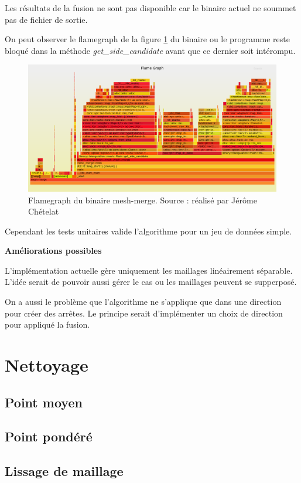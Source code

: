 Les résultats de la fusion ne sont pas disponible car le binaire actuel ne
soummet pas de fichier de sortie.

On peut observer le flamegraph de la figure \ref{fig:flamegraph_mesh_merge}
du binaire ou le programme reste bloqué dans la méthode \textit{get\_side\_candidate}
avant que ce dernier soit intérompu.

\begin{figure}[htbp!]
    \centering
    \includegraphics[width=0.8\linewidth]{figures/merge-debug-flamegraph.png}
    \caption{Flamegraph du binaire mesh-merge. Source : réalisé par Jérôme Chételat}
    \label{fig:flamegraph_mesh_merge}
\end{figure}


Cependant les tests unitaires valide l'algorithme pour un jeu de données simple.

\textbf{Améliorations possibles}

L'implémentation actuelle gère uniquement les maillages linéairement séparable.
L'idée serait de pouvoir aussi gérer le cas ou les maillages peuvent se
supperposé.

On a aussi le problème que l'algorithme ne s'applique que dans une direction
pour créer des arrêtes. Le principe serait d'implémenter un choix de direction
pour appliqué la fusion.

\section{Nettoyage}

\subsection{Point moyen}
\subsection{Point pondéré}

\subsection{Lissage de maillage}
